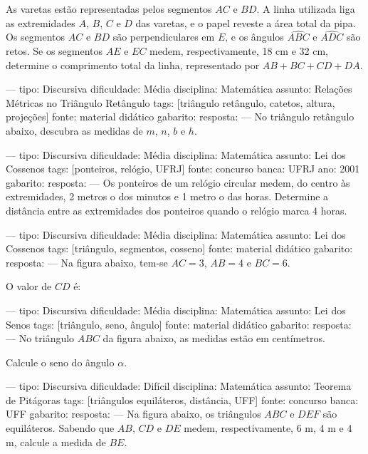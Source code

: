 
As varetas estão representadas pelos segmentos $AC$ e $BD$. A linha utilizada liga as extremidades $A$, $B$, $C$ e $D$ das varetas, e o papel reveste a área total da pipa. Os segmentos $AC$ e $BD$ são perpendiculares em $E$, e os ângulos $\widehat{ABC}$ e $\widehat{ADC}$ são retos. Se os segmentos $AE$ e $EC$ medem, respectivamente, 18 cm e 32 cm, determine o comprimento total da linha, representado por $AB + BC + CD + DA$.

---
tipo: Discursiva
dificuldade: Média
disciplina: Matemática
assunto: Relações Métricas no Triângulo Retângulo
tags: [triângulo retângulo, catetos, altura, projeções]
fonte: material didático
gabarito:
resposta:
---
\question
No triângulo retângulo abaixo, descubra as medidas de $m$, $n$, $b$ e $h$.


---
tipo: Discursiva
dificuldade: Média
disciplina: Matemática
assunto: Lei dos Cossenos
tags: [ponteiros, relógio, UFRJ]
fonte: concurso
banca: UFRJ
ano: 2001
gabarito:
resposta:
---
\question
Os ponteiros de um relógio circular medem, do centro às extremidades, 2 metros o dos minutos e 1 metro o das horas. Determine a distância entre as extremidades dos ponteiros quando o relógio marca 4 horas.

---
tipo: Discursiva
dificuldade: Média
disciplina: Matemática
assunto: Lei dos Cossenos
tags: [triângulo, segmentos, cosseno]
fonte: material didático
gabarito:
resposta:
---
\question
Na figura abaixo, tem-se $AC = 3$, $AB = 4$ e $BC = 6$.


O valor de $CD$ é:

---
tipo: Discursiva
dificuldade: Média
disciplina: Matemática
assunto: Lei dos Senos
tags: [triângulo, seno, ângulo]
fonte: material didático
gabarito:
resposta:
---
\question
No triângulo $ABC$ da figura abaixo, as medidas estão em centímetros.


Calcule o seno do ângulo $\alpha$.

---
tipo: Discursiva
dificuldade: Difícil
disciplina: Matemática
assunto: Teorema de Pitágoras
tags: [triângulos equiláteros, distância, UFF]
fonte: concurso
banca: UFF
gabarito:
resposta:
---
\question
Na figura abaixo, os triângulos $ABC$ e $DEF$ são equiláteros. Sabendo que $AB$, $CD$ e $DE$ medem, respectivamente, 6 m, 4 m e 4 m, calcule a medida de $BE$.

